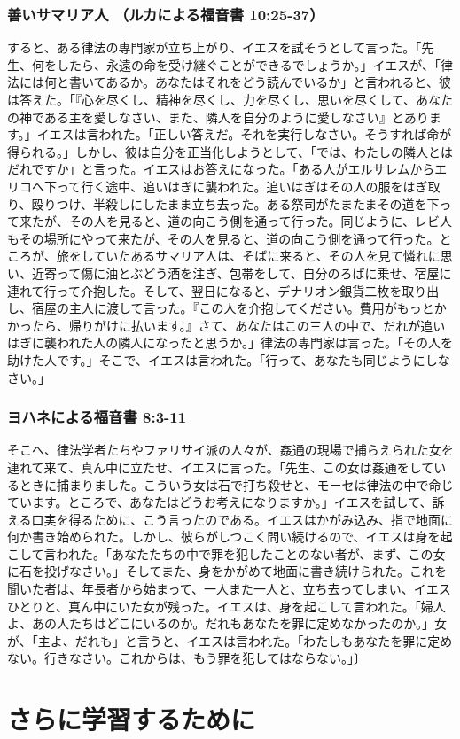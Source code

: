 \documentclass[uplatex,dvipdfmx]{jsarticle} \usepackage{mystyle}%
\begin{document}
\subsubsection*{善いサマリア人 （ルカによる福音書 10:25-37）}


すると、ある律法の専門家が立ち上がり、イエスを試そうとして言った。「先生、何をしたら、永遠の命を受け継ぐことができるでしょうか。」イエスが、「律法には何と書いてあるか。あなたはそれをどう読んでいるか」と言われると、彼は答えた。「『心を尽くし、精神を尽くし、力を尽くし、思いを尽くして、あなたの神である主を愛しなさい、また、隣人を自分のように愛しなさい』とあります。」イエスは言われた。「正しい答えだ。それを実行しなさい。そうすれば命が得られる。」しかし、彼は自分を正当化しようとして、「では、わたしの隣人とはだれですか」と言った。イエスはお答えになった。「ある人がエルサレムからエリコへ下って行く途中、追いはぎに襲われた。追いはぎはその人の服をはぎ取り、殴りつけ、半殺しにしたまま立ち去った。ある祭司がたまたまその道を下って来たが、その人を見ると、道の向こう側を通って行った。同じように、レビ人もその場所にやって来たが、その人を見ると、道の向こう側を通って行った。ところが、旅をしていたあるサマリア人は、そばに来ると、その人を見て憐れに思い、近寄って傷に油とぶどう酒を注ぎ、包帯をして、自分のろばに乗せ、宿屋に連れて行って介抱した。そして、翌日になると、デナリオン銀貨二枚を取り出し、宿屋の主人に渡して言った。『この人を介抱してください。費用がもっとかかったら、帰りがけに払います。』さて、あなたはこの三人の中で、だれが追いはぎに襲われた人の隣人になったと思うか。」律法の専門家は言った。「その人を助けた人です。」そこで、イエスは言われた。「行って、あなたも同じようにしなさい。」


\subsubsection*{ヨハネによる福音書 8:3-11}


そこへ、律法学者たちやファリサイ派の人々が、姦通の現場で捕らえられた女を連れて来て、真ん中に立たせ、イエスに言った。「先生、この女は姦通をしているときに捕まりました。こういう女は石で打ち殺せと、モーセは律法の中で命じています。ところで、あなたはどうお考えになりますか。」イエスを試して、訴える口実を得るために、こう言ったのである。イエスはかがみ込み、指で地面に何か書き始められた。しかし、彼らがしつこく問い続けるので、イエスは身を起こして言われた。「あなたたちの中で罪を犯したことのない者が、まず、この女に石を投げなさい。」そしてまた、身をかがめて地面に書き続けられた。これを聞いた者は、年長者から始まって、一人また一人と、立ち去ってしまい、イエスひとりと、真ん中にいた女が残った。イエスは、身を起こして言われた。「婦人よ、あの人たちはどこにいるのか。だれもあなたを罪に定めなかったのか。」女が、「主よ、だれも」と言うと、イエスは言われた。「わたしもあなたを罪に定めない。行きなさい。これからは、もう罪を犯してはならない。」〕

 \nocite{水田洋06:社会思想小史}
 \nocite{よくわかる法哲学}
 \nocite{よくわかる哲学}





\section{さらに学習するために}






\ifx\mybook\undefined



\end{document}
